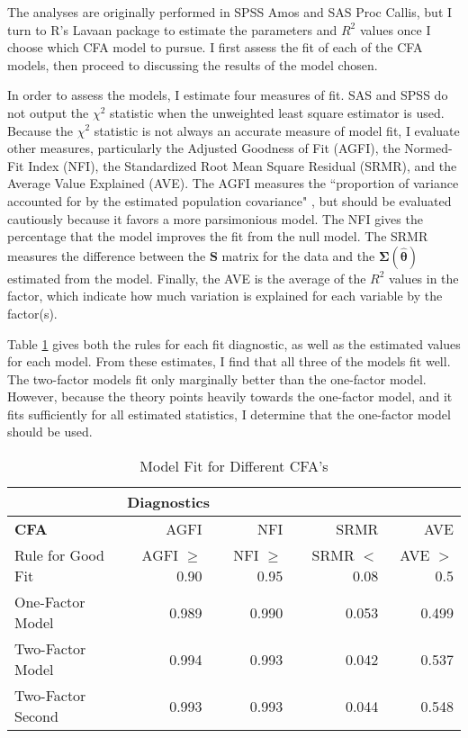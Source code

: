 \documentclass[letterpaper,11pt]{article}
\begin{document}
The analyses are originally performed in SPSS Amos and SAS Proc Callis, but I turn to R's Lavaan package to estimate the parameters and $R^2$ values once I choose which CFA model to pursue. I first assess the fit of each of the CFA models, then proceed to discussing the results of the model chosen.

In order to assess the models, I estimate four measures of fit. SAS and SPSS do not output the $\chi^2$ statistic when the unweighted least square estimator is used. Because the $\chi^2$ statistic is not always an accurate measure of model fit, I evaluate other measures, particularly the Adjusted Goodness of Fit (AGFI), the Normed-Fit Index (NFI), the Standardized Root Mean Square Residual (SRMR), and the Average Value Explained (AVE). 
The AGFI measures the ``proportion of variance accounted for by the estimated population covariance" \cite{parry}, but should be evaluated cautiously because it favors a more parsimonious model. The NFI gives the percentage that the model improves the fit from the null model. The SRMR measures the difference between the $\mathbf{S}$ matrix for the data and the $\boldsymbol{\Sigma}(\hat{\boldsymbol{\theta}})$ estimated from the model. Finally, the AVE is the average of the $R^2$ values in the factor, which indicate how much variation is explained for each variable by the factor(s).

Table \ref{diag} gives both the rules for each fit diagnostic, as well as the estimated values for each model. From these estimates, I find that all three of the models fit well. The two-factor models fit only marginally better than the one-factor model. However, because the theory points heavily towards the one-factor model, and it fits sufficiently for all estimated statistics, I determine that the one-factor model should be used.

\begin{table}[htb]
    \centering
    \caption{Model Fit for Different CFA's}
    \footnotesize
    \begin{tabular}{l|r|r|r|r}
      & \multicolumn{4}{l}{\textbf{Diagnostics}} \\
     \hline
     \textbf{CFA} & AGFI & NFI & SRMR & AVE \\
     Rule for Good Fit & AGFI $\geq$ 0.90 & NFI $\geq$ 0.95 & SRMR $<$ 0.08  & AVE $>$0.5 \\
    \hline
    One-Factor Model & 0.989 & 0.990 & 0.053 & 0.499  \\
    Two-Factor Model & 0.994 & 0.993 & 0.042 & 0.537  \\
    Two-Factor Second & 0.993 & 0.993 & 0.044 & 0.548 \\
    \end{tabular}
    \label{diag}
\end{table}
\end{document}
